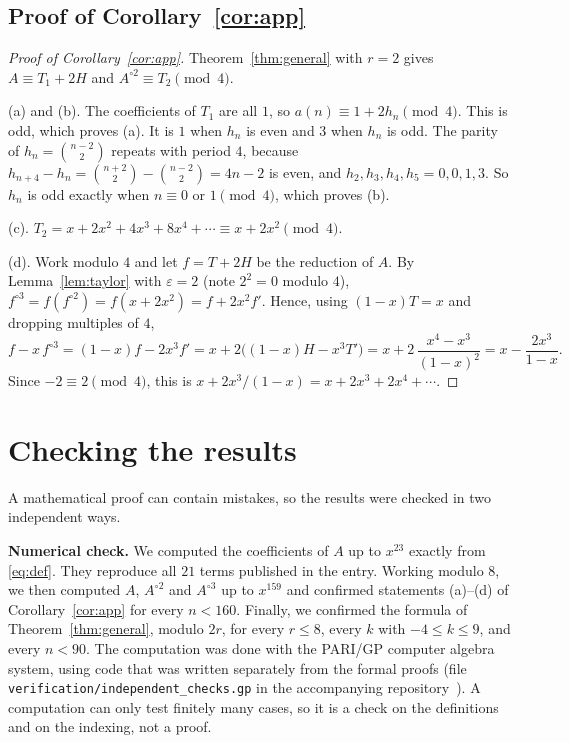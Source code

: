 \documentclass[11pt,a4paper]{article}
\theoremstyle{definition}
\theoremstyle{remark}
\newcommand{\para}[1]{\par\medskip\noindent\textbf{#1}\enspace}
\begin{document}
\subsection{Proof of Corollary~\ref{cor:app}}

\begin{proof}[Proof of Corollary~\ref{cor:app}]
Theorem~\ref{thm:general} with $r=2$ gives $A\equiv T_1+2H$ and $A^{\circ2}\equiv T_2\pmod4$.

(a) and (b). The coefficients of $T_1$ are all $1$, so $a(n)\equiv1+2h_n\pmod4$. This is odd, which proves (a). It
is $1$ when $h_n$ is even and $3$ when $h_n$ is odd. The parity of $h_n=\binom{n-2}{2}$ repeats with period $4$,
because $h_{n+4}-h_n=\binom{n+2}{2}-\binom{n-2}{2}=4n-2$ is even, and $h_2,h_3,h_4,h_5=0,0,1,3$. So $h_n$ is odd
exactly when $n\equiv0$ or $1\pmod4$, which proves (b).

(c). $T_2=x+2x^2+4x^3+8x^4+\cdots\equiv x+2x^2\pmod4$.

(d). Work modulo $4$ and let $f=T+2H$ be the reduction of $A$. By Lemma~\ref{lem:taylor} with $\varepsilon=2$
(note $2^2=0$ modulo $4$), $f^{\circ3}=f(f^{\circ2})=f(x+2x^2)=f+2x^2f'$. Hence, using $(1-x)T=x$ and dropping
multiples of $4$,
\[
f-x\,f^{\circ3}=(1-x)f-2x^3f'=x+2\bigl((1-x)H-x^3T'\bigr)=x+2\,\frac{x^4-x^3}{(1-x)^2}=x-\frac{2x^3}{1-x}.
\]
Since $-2\equiv2\pmod4$, this is $x+2x^3/(1-x)=x+2x^3+2x^4+\cdots$.
\end{proof}

\section{Checking the results}\label{sec:checks}

A mathematical proof can contain mistakes, so the results were checked in two independent ways.

\para{Numerical check.}
We computed the coefficients of $A$ up to $x^{23}$ exactly from \eqref{eq:def}. They reproduce all
$21$ terms published in the entry. Working modulo $8$, we then computed $A$, $A^{\circ2}$ and $A^{\circ3}$ up to
$x^{159}$ and confirmed statements (a)--(d) of Corollary~\ref{cor:app} for every $n<160$. Finally, we confirmed the
formula of Theorem~\ref{thm:general}, modulo $2r$, for every $r\le8$, every $k$ with $-4\le k\le9$, and every $n<90$.
The computation was done with the PARI/GP computer algebra system, using code that was written separately from the
formal proofs (file \texttt{verification/independent\_checks.gp} in the accompanying repository~\cite{repo}).
A computation can only test finitely many cases, so it is a check on the definitions and on the indexing, not a proof.
\end{document}
